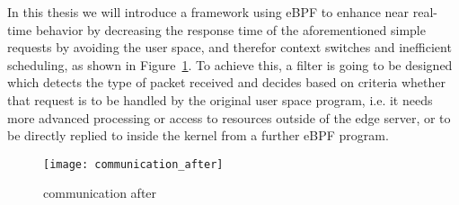 In this thesis we will introduce a framework using eBPF to enhance near
real-time behavior by decreasing the response time of the aforementioned simple
requests by avoiding the user space, and therefor context switches and
inefficient scheduling, as shown in Figure~\ref{fig:communication_after}. To
achieve this, a filter is going to be designed which detects the type of packet
received and decides based on criteria whether that request is to be handled by
the original user space program, i.e. it needs more advanced processing or
access to resources outside of the edge server, or to be directly replied to
inside the kernel from a further eBPF program.


\begin{figure}[htpb]
       \centering
       \texttt{[image: communication\_after]}
       \caption{communication after%
       \label{fig:communication_after}}%
\end{figure}
